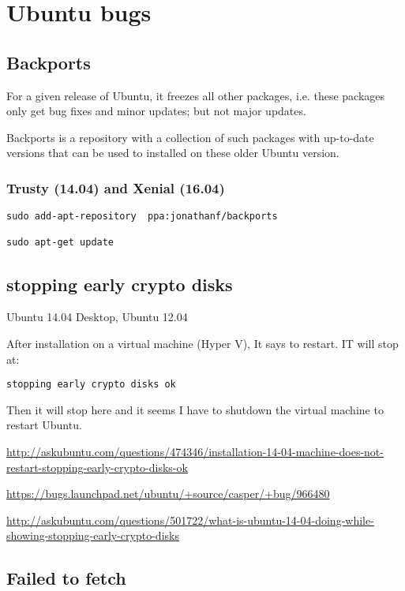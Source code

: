 \chapter{Ubuntu bugs}


\section{Backports}

For a given release of Ubuntu, it freezes all other packages, i.e. these
packages only get bug fixes and minor updates; but not major updates.

Backports is a repository with a collection of such packages with up-to-date
versions that can be used to installed on these older Ubuntu version.

\subsection{Trusty (14.04) and Xenial (16.04)}	

\begin{verbatim}
sudo add-apt-repository  ppa:jonathanf/backports

sudo apt-get update
\end{verbatim}




\section{stopping early crypto disks}

Ubuntu 14.04 Desktop, Ubuntu 12.04

After installation on a virtual machine (Hyper V), It says to restart. IT will stop at:

\begin{verbatim}
stopping early crypto disks ok
\end{verbatim}
Then it will stop here and it seems I have to shutdown the virtual machine to restart Ubuntu.

\url{http://askubuntu.com/questions/474346/installation-14-04-machine-does-not-restart-stopping-early-crypto-disks-ok}

\url{https://bugs.launchpad.net/ubuntu/+source/casper/+bug/966480}

\url{http://askubuntu.com/questions/501722/what-is-ubuntu-14-04-doing-while-showing-stopping-early-crypto-disks}


\section{Failed to fetch }

